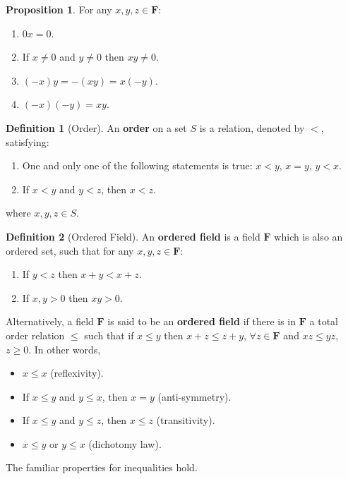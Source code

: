 \documentclass[tikz,12pt,a4paper]{article}
\theoremstyle{definition}
\newtheorem{proposition}[theorem]{Proposition}
\newtheorem{definition}{Definition}[section]
\begin{document}
\begin{proposition}
  For any $x,y,z \in \textbf{F}$:
  \begin{enumerate}
    \item $0x = 0$.
    \item If $x \neq 0$ and $y \neq 0$ then $xy \neq 0$.
    \item $(-x)y = -(xy) = x(-y)$.
    \item $(-x)(-y) = xy$.
  \end{enumerate}
\end{proposition}

\begin{definition}[Order]
An \textbf{order} on a set \(S\) is a relation, denoted by \(<\),
satisfying:
\begin{enumerate}
  \item One and only one of the following statements is true: \(x < y\),
  \(x = y\), \(y < x\).
  \item If \(x < y\) and \(y < z\), then \(x < z\).
\end{enumerate}
where \(x,y,z \in S\).
\end{definition}

\begin{definition}[Ordered Field]
  An \textbf{ordered field} is a field $\textbf{F}$ which is also an ordered set, such that for any $x, y, z \in \textbf{F}$:
  \begin{enumerate}
    \item If $y < z$ then $x+y < x+z$.
    \item If $x, y > 0$ then $xy > 0$.
  \end{enumerate}
  
  Alternatively, a field $\textbf{F}$ is said to be an \textbf{ordered field} if there is in $\textbf{F}$ a total order relation $\leq$ such that if $x \leq y$ then $x + z \leq z + y$, $\forall z \in \textbf{F}$ and $xz \leq yz$, $z \geq 0$. In other words,
  \begin{itemize}
  	\item $x \leq x$ (reflexivity).
  	\item If $x \leq y$ and $y \leq x$, then $ x = y$ (anti-symmetry).
  	\item If $x \leq y$ and $y \leq z$, then $ x \leq z$ (transitivity).
  	\item $x \leq y$ or $y \leq x$ (dichotomy law).
  \end{itemize}
\end{definition}

The familiar properties for inequalities hold. 
\end{document}
